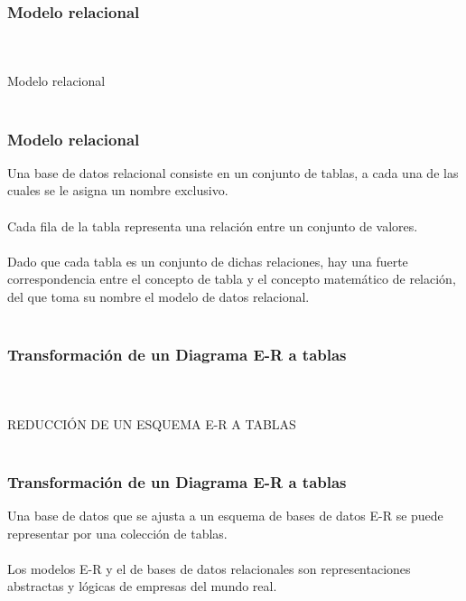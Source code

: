 \documentclass[t,24pt,aspectratio=169]{beamer}
\begin{document}
\begin{frame}
    \frametitle{Modelo relacional}
        \vfill
\centering
\\~\\
\Huge{Modelo relacional}
\\~\\
        \vfill
\end{frame}




\begin{frame}
    \frametitle{Modelo relacional}
        \vfill
Una base de datos relacional consiste en un conjunto de tablas, a cada una de las cuales se le asigna un nombre exclusivo.
\\~\\
Cada fila de la tabla representa una relación entre un conjunto de valores.
\\~\\
Dado que cada tabla es un conjunto de dichas relaciones, hay una fuerte correspondencia entre el concepto de tabla y el concepto matemático de relación, del que toma su nombre el modelo de datos relacional.
\\~\\
        \vfill
\end{frame}




\begin{frame}
    \frametitle{Transformación de un Diagrama E-R a tablas}
        \vfill
\centering
\\~\\
\Huge{REDUCCIÓN DE UN ESQUEMA E-R A TABLAS}
\\~\\
        \vfill
\end{frame}




\begin{frame}
    \frametitle{Transformación de un Diagrama E-R a tablas}
        \vfill
Una base de datos que se ajusta a un esquema de bases de datos E-R se puede representar por una colección de tablas.
\\~\\
Los modelos E-R y el de bases de datos relacionales son representaciones abstractas y lógicas de empresas del mundo real.
\\~\\
        \vfill
\end{frame}
\end{document}
